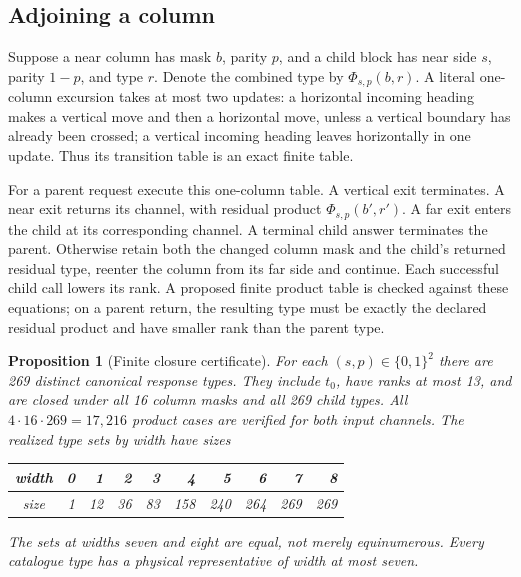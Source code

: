 \documentclass[11pt]{article}
\newtheorem{proposition}[theorem]{Proposition}
\theoremstyle{definition}\newtheorem{definition}[theorem]{Definition}
\begin{document}
\subsection{Adjoining a column}
Suppose a near column has mask $b$, parity $p$, and a child block has near side
$s$, parity $1-p$, and type $r$. Denote the combined type by
$\Phi_{s,p}(b,r)$.
A literal one-column excursion takes at most two updates: a horizontal incoming
heading makes a vertical move and then a horizontal move, unless a vertical
boundary has already been crossed; a vertical incoming heading leaves
horizontally in one update. Thus its transition table is an exact finite table.

For a parent request execute this one-column table. A vertical exit terminates.
A near exit returns its channel, with residual product
$\Phi_{s,p}(b',r')$. A far exit enters the child at its corresponding channel.
A terminal child answer terminates the parent. Otherwise retain both the changed
column mask and the child's returned residual type, reenter the column from its
far side and continue. Each successful child call lowers its rank. A proposed
finite product table is checked against these equations; on a parent return,
the resulting type must be exactly the declared residual product and have
smaller rank than the parent type.

\begin{proposition}[Finite closure certificate]\label{prop:catalogue}
For each $(s,p)\in\{0,1\}^2$ there are 269 distinct canonical response types.
They include $t_0$, have ranks at most 13, and are closed under all 16 column
masks and all 269 child types. All $4\cdot16\cdot269=17,216$ product cases are
verified for both input channels. The realized type sets by width have sizes
\begin{center}
\begin{tabular}{c|rrrrrrrrr}
width&0&1&2&3&4&5&6&7&8\\\hline
size&1&12&36&83&158&240&264&269&269
\end{tabular}
\end{center}
The sets at widths seven and eight are equal, not merely equinumerous.
Every catalogue type has a physical representative of width at most seven.
\end{proposition}
\end{document}
